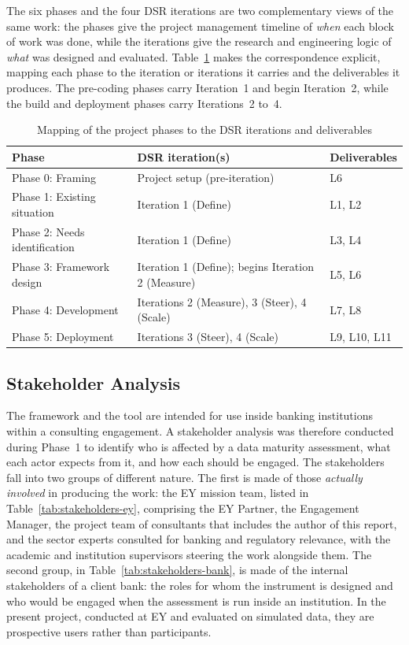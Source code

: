The six phases and the four DSR iterations are two complementary views of the same work: the phases give the project management timeline of \emph{when} each block of work was done, while the iterations give the research and engineering logic of \emph{what} was designed and evaluated. Table~\ref{tab:phase-iteration-map} makes the correspondence explicit, mapping each phase to the iteration or iterations it carries and the deliverables it produces. The pre-coding phases carry Iteration~1 and begin Iteration~2, while the build and deployment phases carry Iterations~2 to~4.

\begin{table}[H]
\centering
\caption{Mapping of the project phases to the DSR iterations and deliverables} \label{tab:phase-iteration-map}

\footnotesize
\setlength{\tabcolsep}{4pt}
\begin{tabular}{|p{4.2cm}|p{4.6cm}|p{5.4cm}|}
\hline
\textbf{Phase} & \textbf{DSR iteration(s)} & \textbf{Deliverables} \\
\hline
Phase 0: Framing & Project setup (pre-iteration) & L6 \\
\hline
Phase 1: Existing situation & Iteration 1 (Define) & L1, L2 \\
\hline
Phase 2: Needs identification & Iteration 1 (Define) & L3, L4 \\
\hline
Phase 3: Framework design & Iteration 1 (Define); begins Iteration 2 (Measure) & L5, L6 \\
\hline
Phase 4: Development & Iterations 2 (Measure), 3 (Steer), 4 (Scale) & L7, L8 \\
\hline
Phase 5: Deployment & Iterations 3 (Steer), 4 (Scale) & L9, L10, L11 \\
\hline
\end{tabular}

\end{table}

\subsection{Stakeholder Analysis}

The framework and the tool are intended for use inside banking institutions within a consulting engagement. A stakeholder analysis was therefore conducted during Phase~1 to identify who is affected by a data maturity assessment, what each actor expects from it, and how each should be engaged. The stakeholders fall into two groups of different nature. The first is made of those \emph{actually involved} in producing the work: the EY mission team, listed in Table~\ref{tab:stakeholders-ey}, comprising the EY Partner, the Engagement Manager, the project team of consultants that includes the author of this report, and the sector experts consulted for banking and regulatory relevance, with the academic and institution supervisors steering the work alongside them. The second group, in Table~\ref{tab:stakeholders-bank}, is made of the internal stakeholders of a client bank: the roles for whom the instrument is designed and who would be engaged when the assessment is run inside an institution. In the present project, conducted at EY and evaluated on simulated data, they are prospective users rather than participants.

